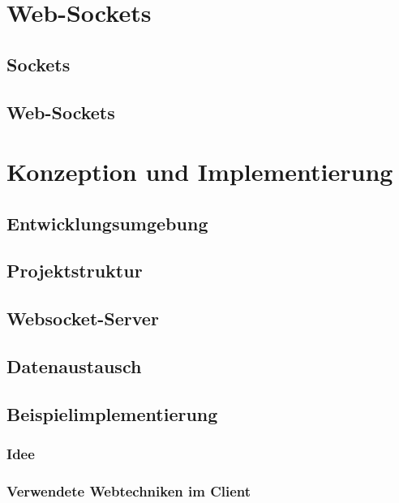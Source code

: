 \documentclass[toc=bib,toc=listof, 12pt]{scrreprt}
\begin{document}
\chapter{Web-Sockets}
\setcounter{page}{16}
	\section{Sockets}
	\label{sec:sockets}
		
		\pagebreak
	\section{Web-Sockets}
		
\newpage
\clearpage
\thispagestyle{empty}
		
\chapter{Konzeption und Implementierung}
\label{sec:konzeption}
\setcounter{page}{24}
	\section{Entwicklungsumgebung}
		
	\section{Projektstruktur}
		
	\section{Websocket-Server}
		
		
		
	\section{Datenaustausch}
		
	\section{Beispielimplementierung}
		\subsection{Idee}
			
			
		\subsection{Verwendete Webtechniken im Client}
				
\end{document}
